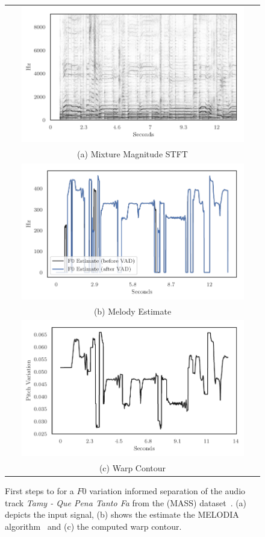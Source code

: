\begin{figure}
  \centering
\begin{tabular}{c}
  \includegraphics[width=0.9\textwidth]{Chapters/05_Separation_Known/warp-demo/Mixture.pdf} \\
(a) Mixture Magnitude STFT \\[6pt]
\includegraphics[width=0.9\textwidth]{Chapters/05_Separation_Known/warp-demo/Melodia.pdf} \\
(b) Melody Estimate \\[6pt]
\includegraphics[width=0.9\textwidth]{Chapters/05_Separation_Known/warp-demo/Contour.pdf} \\
(c) Warp Contour \\[6pt]
\end{tabular}
\caption{First steps to for a $F0$ variation informed separation of the audio track \emph{Tamy - Que Pena Tanto Fa} from the (MASS) dataset~\cite{MTGMASSdb}. (a) depicts the input signal, (b) shows the estimate the MELODIA algorithm~\cite{salamon12} and (c) the computed warp contour.} %
\label{fig:warp_sisec_demoa}
\end{figure}


